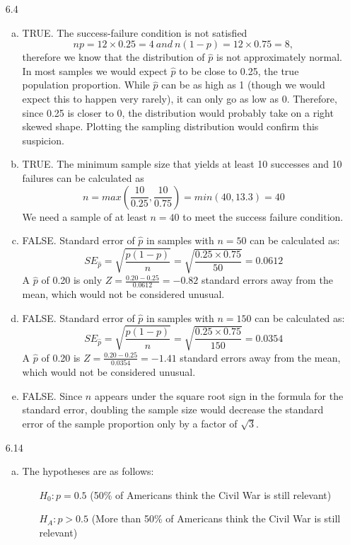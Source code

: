\documentclass[11pt]{article}
\begin{document}
\begin{enumerate}
\item[6.4]
\begin{enumerate}[(a)]
\item TRUE. The success-failure condition is not satisfied
\[ np = 12 \times  0.25 = 4~and~ n(1-p) = 12 \times  0.75 = 8, \]
therefore we know that the distribution of $\hat{p}$ is not approximately normal. In most samples we would expect $\hat{p}$ to be close to 0.25, the true population proportion. While $\hat{p}$ can be as high as 1 (though we would expect this to happen very rarely), it can only go as low as 0. Therefore, since 0.25 is closer to 0, the distribution would probably take on a right skewed shape. Plotting the sampling distribution would confirm this suspicion.
\item TRUE. The minimum sample size that yields at least 10 successes and 10 failures can be calculated as
\[ n = max \left( \frac{10}{0.25}, \frac{10}{0.75} \right) = min(40, 13.3) = 40 \]
We need a sample of at least $n = 40$ to meet the success failure condition.
\item FALSE. Standard error of $\hat{p}$ in samples with $n = 50$ can be calculated as:
\[SE_{\hat{p}} = \sqrt{ \frac{p(1-p)}{n} } = \sqrt{\frac{0.25 \times  0.75}{50}} = 0.0612 \]
A $\hat{p}$ of 0.20 is only $Z = \frac{0.20 - 0.25}{0.0612} = -0.82$ standard errors away from the mean, which would not be considered unusual.
\item FALSE. Standard error of $\hat{p}$ in samples with $n = 150$ can be calculated as:
\[SE_{\hat{p}} = \sqrt{ \frac{p(1-p)}{n} } = \sqrt{\frac{0.25 \times  0.75}{150}} = 0.0354 \]
A $\hat{p}$ of 0.20 is $Z = \frac{0.20 - 0.25}{0.0354} = -1.41$ standard errors away from the mean, which would not be considered unusual.
\item FALSE.  Since $n$ appears under the square root sign in the formula for the standard error, doubling the sample size would decrease the standard error of the sample proportion only by a factor of $\sqrt{3}$.
\end{enumerate}

%

\item[6.14]
\begin{enumerate}[(a)]
\item The hypotheses are as follows:
\begin{itemize}
\item[] $H_0: p = 0.5$ (50\% of Americans think the Civil War is still relevant)
\item[] $H_A: p > 0.5$ (More than 50\% of Americans think the Civil War is still relevant)
\end{itemize}


\end{enumerate}
\end{enumerate}
\end{document}
